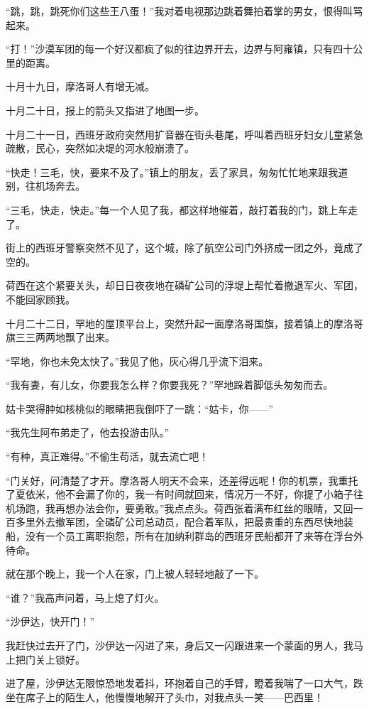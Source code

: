 \par “跳，跳，跳死你们这些王八蛋！”我对着电视那边跳着舞拍着掌的男女，恨得叫骂起来。
\par “打！”沙漠军团的每一个好汉都疯了似的往边界开去，边界与阿雍镇，只有四十公里的距离。
\par 十月十九日，摩洛哥人有增无减。
\par 十月二十日，报上的箭头又指进了地图一步。
\par 十月二十一日，西班牙政府突然用扩音器在街头巷尾，呼叫着西班牙妇女儿童紧急疏散，民心，突然如决堤的河水般崩溃了。
\par “快走！三毛，快，要来不及了。”镇上的朋友，丢了家具，匆匆忙忙地来跟我道别，往机场奔去。
\par “三毛，快走，快走。”每一个人见了我，都这样地催着，敲打着我的门，跳上车走了。
\par 街上的西班牙警察突然不见了，这个城，除了航空公司门外挤成一团之外，竟成了空的。
\par 荷西在这个紧要关头，却日日夜夜地在磷矿公司的浮堤上帮忙着撤退军火、军团，不能回家顾我。
\par 十月二十二日，罕地的屋顶平台上，突然升起一面摩洛哥国旗，接着镇上的摩洛哥旗三三两两地飘了出来。
\par “罕地，你也未免太快了。”我见了他，灰心得几乎流下泪来。
\par “我有妻，有儿女，你要我怎么样？你要我死？”罕地跺着脚低头匆匆而去。
\par 姑卡哭得肿如核桃似的眼睛把我倒吓了一跳：“姑卡，你——”
\par “我先生阿布弟走了，他去投游击队。”
\par “有种，真正难得。”不偷生苟活，就去流亡吧！
\par “门关好，问清楚了才开。摩洛哥人明天不会来，还差得远呢！你的机票，我重托了夏依米，他不会漏了你的，我一有时间就回来，情况万一不好，你提了小箱子往机场跑，我再想办法会你，要勇敢。”我点点头。荷西张着满布红丝的眼睛，又回一百多里外去撤军团，全磷矿公司总动员，配合着军队，把最贵重的东西尽快地装船，没有一个员工离职抱怨，所有在加纳利群岛的西班牙民船都开了来等在浮台外待命。
\par 就在那个晚上，我一个人在家，门上被人轻轻地敲了一下。
\par “谁？”我高声问着，马上熄了灯火。
\par “沙伊达，快开门！”
\par 我赶快过去开了门，沙伊达一闪进了来，身后又一闪跟进来一个蒙面的男人，我马上把门关上锁好。
\par 进了屋，沙伊达无限惊恐地发着抖，环抱着自己的手臂，瞪着我喘了一口大气，跌坐在席子上的陌生人，他慢慢地解开了头巾，对我点头一笑——巴西里！
